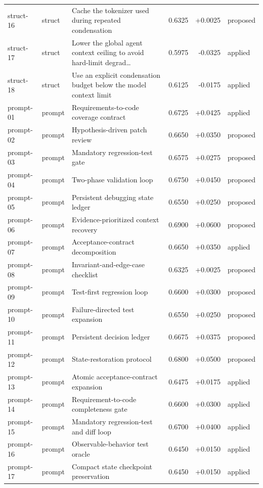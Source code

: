 \begin{center}
\begin{longtable}{llp{5.2cm}rrl}
struct-16 & struct & Cache the tokenizer used during repeated condensation & 0.6325 & +0.0025 & proposed \\
struct-17 & struct & Lower the global agent context ceiling to avoid hard-limit degrad\ldots{} & 0.5975 & -0.0325 & applied \\
struct-18 & struct & Use an explicit condensation budget below the model context limit & 0.6125 & -0.0175 & applied \\
prompt-01 & prompt & Requirements-to-code coverage contract & 0.6725 & +0.0425 & applied \\
prompt-02 & prompt & Hypothesis-driven patch review & 0.6650 & +0.0350 & proposed \\
prompt-03 & prompt & Mandatory regression-test gate & 0.6575 & +0.0275 & proposed \\
prompt-04 & prompt & Two-phase validation loop & 0.6750 & +0.0450 & proposed \\
prompt-05 & prompt & Persistent debugging state ledger & 0.6550 & +0.0250 & proposed \\
prompt-06 & prompt & Evidence-prioritized context recovery & 0.6900 & +0.0600 & proposed \\
prompt-07 & prompt & Acceptance-contract decomposition & 0.6650 & +0.0350 & applied \\
prompt-08 & prompt & Invariant-and-edge-case checklist & 0.6325 & +0.0025 & proposed \\
prompt-09 & prompt & Test-first regression loop & 0.6600 & +0.0300 & proposed \\
prompt-10 & prompt & Failure-directed test expansion & 0.6550 & +0.0250 & proposed \\
prompt-11 & prompt & Persistent decision ledger & 0.6675 & +0.0375 & proposed \\
prompt-12 & prompt & State-restoration protocol & 0.6800 & +0.0500 & proposed \\
prompt-13 & prompt & Atomic acceptance-contract expansion & 0.6475 & +0.0175 & applied \\
prompt-14 & prompt & Requirement-to-code completeness gate & 0.6600 & +0.0300 & applied \\
prompt-15 & prompt & Mandatory regression-test and diff loop & 0.6700 & +0.0400 & applied \\
prompt-16 & prompt & Observable-behavior test oracle & 0.6450 & +0.0150 & applied \\
prompt-17 & prompt & Compact state checkpoint preservation & 0.6450 & +0.0150 & applied \\

\end{longtable}
\end{center}
